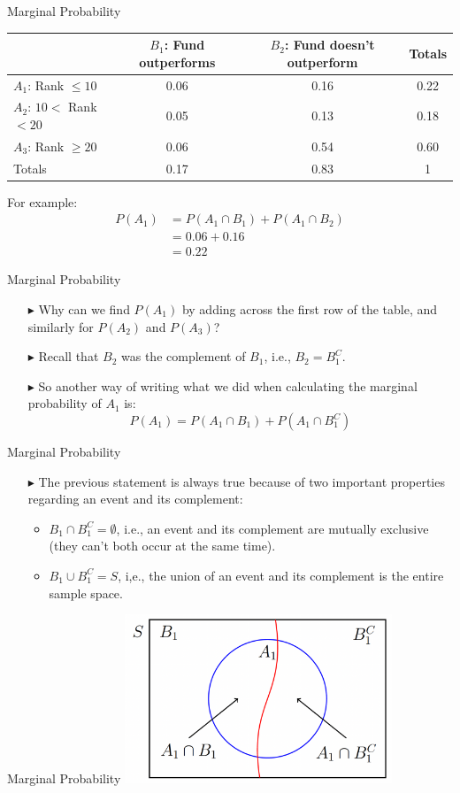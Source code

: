 \documentclass[12pt]{beamer}
\begin{document}
\begin{frame}{Marginal Probability}
	\begin{center}
		\begin{tabular}{lccc}
			\toprule
			&\parbox[t]{3cm}{$B_1$: Fund \\outperforms} &\parbox[t]{3cm}{$B_2$: Fund doesn't\\ outperform}&Totals\\
			\hline
			$A_1$: Rank $\le10$&0.06&0.16&0.22\\
			$A_2$: $10<$ Rank $<20$&0.05&0.13&0.18\\
			$A_3$: Rank $\ge20$&0.06&0.54&0.60\\
			\hline
			Totals&0.17&0.83&1\\
			\bottomrule
		\end{tabular}
	\end{center}
For example:
\begin{align*}
	P(A_1)&=P(A_1\cap B_1)+P(A_1\cap B_2)\\
	&=0.06+0.16\\
	&=0.22
\end{align*}
\end{frame}
\begin{frame}{Marginal Probability}
\begin{itemize}
	\item[$\blacktriangleright$] Why can we find $P(A_1)$ by adding across the first row of the table, and similarly for $P(A_2)$ and $P(A_3)$?
	\item[$\blacktriangleright$] Recall that $B_2$ was the complement of $B_1$, i.e., $B_2 = B_1^C$.
	\item[$\blacktriangleright$] So another way of writing what we did when calculating the marginal probability of $A_1$ is:
	$$P(A_1)=P(A_1\cap B_1)+P(A_1\cap B_1^C)$$
\end{itemize}
\end{frame}
\begin{frame}{Marginal Probability}
	\begin{itemize}
		\item[$\blacktriangleright$] The previous statement is always true because of two important properties regarding an event and its complement:
		\begin{itemize}
			\item $B_1\cap B_1^C=\emptyset$, i.e., an event and its complement are mutually exclusive (they can't both occur at the same time).
			\item  $B_1\cup B_1^C=S$, i,e., the union of an event and its complement is the entire sample space.
		\end{itemize}
	\end{itemize}
\end{frame}
\begin{frame}{Marginal Probability}
\centering
\includegraphics[width=8cm]{marginal.png}
\end{frame}
\end{document}
